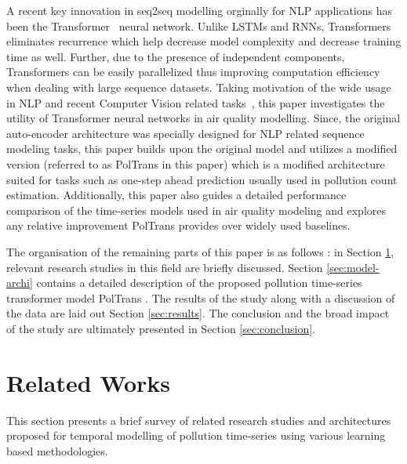 \documentclass[10pt,journal]{IEEEtran}
\begin{document}
A recent key innovation in seq2seq modelling orginally for NLP applications has been the Transformer~\cite{Vaswani.2017} neural network. Unlike LSTMs and RNNs, Transformers eliminates recurrence which help decrease model complexity and decrease training time as well. Further, due to the presence of independent components, Transformers can be easily parallelized thus improving computation efficiency when dealing with large sequence datasets.  Taking motivation of the wide usage in NLP and recent Computer Vision related tasks~\cite{Parmer.2018}, this paper investigates the utility of Transformer neural networks in air quality modelling. Since, the original  auto-encoder architecture was specially designed for NLP related sequence modeling tasks, this paper builds upon the original model and utilizes a modified version (referred to as {PolTrans} in this paper) which is a modified architecture suited for tasks such as one-step ahead prediction usually used in pollution count estimation. Additionally, this paper also guides a detailed performance comparison of the time-series models used in air quality modeling and explores any relative improvement {PolTrans}  provides over widely used baselines.

The organisation of the remaining parts of this paper is as follows : in Section \ref{sec:related-works}, relevant research studies in this field are briefly discussed. Section \ref{sec:model-archi} contains a detailed description of the proposed pollution time-series transformer model {PolTrans} . The results of the study along with a discussion of the data are laid out Section \ref{sec:results}. The conclusion and the broad impact of the study are ultimately presented in Section \ref{sec:conclusion}.

\section{Related Works}
\label{sec:related-works}

This section presents a brief survey of related research studies and architectures proposed for temporal modelling of pollution time-series using various learning based methodologies.
\end{document}
